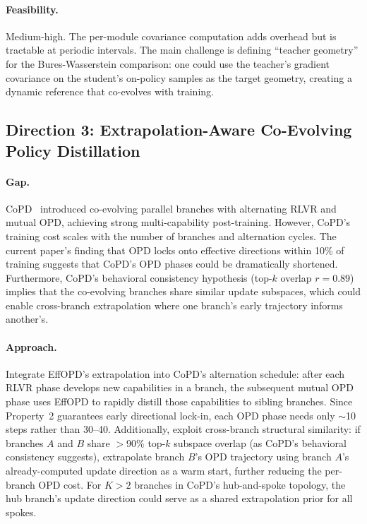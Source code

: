 \documentclass[11pt,a4paper]{article}
\begin{document}
\paragraph{Feasibility.} Medium-high. The per-module covariance computation adds overhead but is tractable at periodic intervals. The main challenge is defining ``teacher geometry'' for the Bures-Wasserstein comparison: one could use the teacher's gradient covariance on the student's on-policy samples as the target geometry, creating a dynamic reference that co-evolves with training.

\subsection{Direction 3: Extrapolation-Aware Co-Evolving Policy Distillation}

\paragraph{Gap.} CoPD~\cite{copd} introduced co-evolving parallel branches with alternating RLVR and mutual OPD, achieving strong multi-capability post-training. However, CoPD's training cost scales with the number of branches and alternation cycles. The current paper's finding that OPD locks onto effective directions within 10\% of training suggests that CoPD's OPD phases could be dramatically shortened. Furthermore, CoPD's behavioral consistency hypothesis (top-$k$ overlap $r{=}0.89$) implies that the co-evolving branches share similar update subspaces, which could enable cross-branch extrapolation where one branch's early trajectory informs another's.

\paragraph{Approach.} Integrate EffOPD's extrapolation into CoPD's alternation schedule: after each RLVR phase develops new capabilities in a branch, the subsequent mutual OPD phase uses EffOPD to rapidly distill those capabilities to sibling branches. Since Property~2 guarantees early directional lock-in, each OPD phase needs only ${\sim}$10 steps rather than 30--40. Additionally, exploit cross-branch structural similarity: if branches $A$ and $B$ share $>$90\% top-$k$ subspace overlap (as CoPD's behavioral consistency suggests), extrapolate branch $B$'s OPD trajectory using branch $A$'s already-computed update direction as a warm start, further reducing the per-branch OPD cost. For $K{>}2$ branches in CoPD's hub-and-spoke topology, the hub branch's update direction could serve as a shared extrapolation prior for all spokes.
\end{document}
